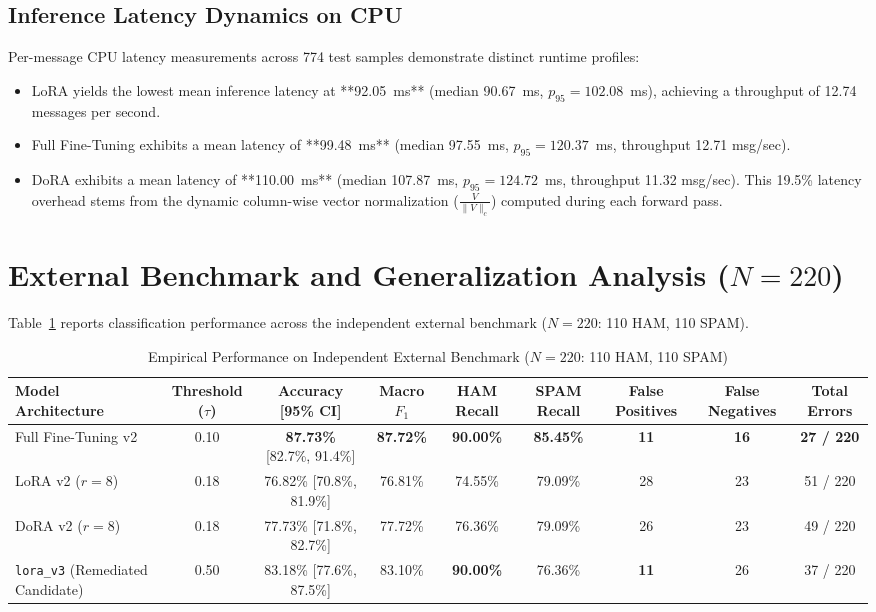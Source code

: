 \documentclass[conference]{IEEEtran}
\begin{document}
\subsection{Inference Latency Dynamics on CPU}
Per-message CPU latency measurements across 774 test samples demonstrate distinct runtime profiles:
\begin{itemize}
    \item LoRA yields the lowest mean inference latency at **92.05~ms** (median 90.67~ms, $p_{95} = 102.08$~ms), achieving a throughput of 12.74 messages per second.
    \item Full Fine-Tuning exhibits a mean latency of **99.48~ms** (median 97.55~ms, $p_{95} = 120.37$~ms, throughput 12.71 msg/sec).
    \item DoRA exhibits a mean latency of **110.00~ms** (median 107.87~ms, $p_{95} = 124.72$~ms, throughput 11.32 msg/sec). This 19.5\% latency overhead stems from the dynamic column-wise vector normalization ($\frac{V}{\|V\|_c}$) computed during each forward pass.
\end{itemize}

\section{External Benchmark and Generalization Analysis ($N=220$)}
\label{sec:benchmark_analysis}

Table~\ref{tab:benchmark_results} reports classification performance across the independent external benchmark ($N=220$: 110 HAM, 110 SPAM).

\begin{table}[t]
\caption{Empirical Performance on Independent External Benchmark ($N=220$: 110 HAM, 110 SPAM)}
\label{tab:benchmark_results}
\centering
\begin{tabularx}{\textwidth}{lcccccccc}
\toprule
\textbf{Model Architecture} & \textbf{Threshold ($\tau$)} & \textbf{Accuracy [95\% CI]} & \textbf{Macro $F_1$} & \textbf{HAM Recall} & \textbf{SPAM Recall} & \textbf{False Positives} & \textbf{False Negatives} & \textbf{Total Errors} \\
\midrule
Full Fine-Tuning v2 & 0.10 & \textbf{87.73\%} [82.7\%, 91.4\%] & \textbf{87.72\%} & \textbf{90.00\%} & \textbf{85.45\%} & \textbf{11} & \textbf{16} & \textbf{27 / 220} \\
LoRA v2 ($r=8$) & 0.18 & 76.82\% [70.8\%, 81.9\%] & 76.81\% & 74.55\% & 79.09\% & 28 & 23 & 51 / 220 \\
DoRA v2 ($r=8$) & 0.18 & 77.73\% [71.8\%, 82.7\%] & 77.72\% & 76.36\% & 79.09\% & 26 & 23 & 49 / 220 \\
\midrule
\texttt{lora\_v3} (Remediated Candidate) & 0.50 & 83.18\% [77.6\%, 87.5\%] & 83.10\% & \textbf{90.00\%} & 76.36\% & \textbf{11} & 26 & 37 / 220 \\
\bottomrule
\end{tabularx}
\end{table}
\end{document}
